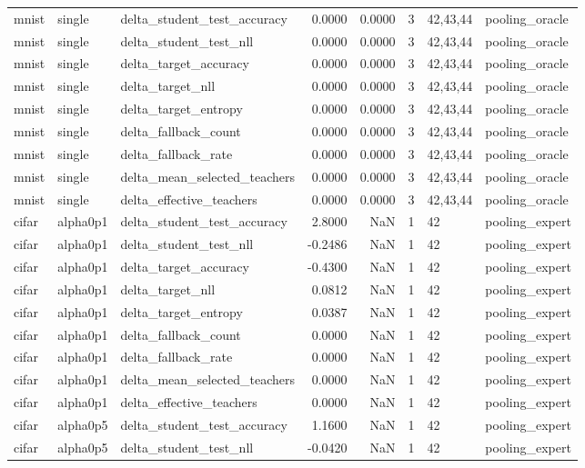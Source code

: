 \begin{tabular}{lllrrrll}
mnist & single & delta\_student\_test\_accuracy & 0.0000 & 0.0000 & 3 & 42,43,44 & pooling\_oracle \\
mnist & single & delta\_student\_test\_nll & 0.0000 & 0.0000 & 3 & 42,43,44 & pooling\_oracle \\
mnist & single & delta\_target\_accuracy & 0.0000 & 0.0000 & 3 & 42,43,44 & pooling\_oracle \\
mnist & single & delta\_target\_nll & 0.0000 & 0.0000 & 3 & 42,43,44 & pooling\_oracle \\
mnist & single & delta\_target\_entropy & 0.0000 & 0.0000 & 3 & 42,43,44 & pooling\_oracle \\
mnist & single & delta\_fallback\_count & 0.0000 & 0.0000 & 3 & 42,43,44 & pooling\_oracle \\
mnist & single & delta\_fallback\_rate & 0.0000 & 0.0000 & 3 & 42,43,44 & pooling\_oracle \\
mnist & single & delta\_mean\_selected\_teachers & 0.0000 & 0.0000 & 3 & 42,43,44 & pooling\_oracle \\
mnist & single & delta\_effective\_teachers & 0.0000 & 0.0000 & 3 & 42,43,44 & pooling\_oracle \\
cifar & alpha0p1 & delta\_student\_test\_accuracy & 2.8000 & NaN & 1 & 42 & pooling\_expert \\
cifar & alpha0p1 & delta\_student\_test\_nll & -0.2486 & NaN & 1 & 42 & pooling\_expert \\
cifar & alpha0p1 & delta\_target\_accuracy & -0.4300 & NaN & 1 & 42 & pooling\_expert \\
cifar & alpha0p1 & delta\_target\_nll & 0.0812 & NaN & 1 & 42 & pooling\_expert \\
cifar & alpha0p1 & delta\_target\_entropy & 0.0387 & NaN & 1 & 42 & pooling\_expert \\
cifar & alpha0p1 & delta\_fallback\_count & 0.0000 & NaN & 1 & 42 & pooling\_expert \\
cifar & alpha0p1 & delta\_fallback\_rate & 0.0000 & NaN & 1 & 42 & pooling\_expert \\
cifar & alpha0p1 & delta\_mean\_selected\_teachers & 0.0000 & NaN & 1 & 42 & pooling\_expert \\
cifar & alpha0p1 & delta\_effective\_teachers & 0.0000 & NaN & 1 & 42 & pooling\_expert \\
cifar & alpha0p5 & delta\_student\_test\_accuracy & 1.1600 & NaN & 1 & 42 & pooling\_expert \\
cifar & alpha0p5 & delta\_student\_test\_nll & -0.0420 & NaN & 1 & 42 & pooling\_expert \\

\end{tabular}
